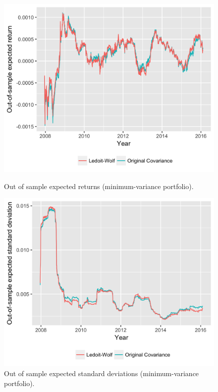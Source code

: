 \documentclass[letterpaper,12pt]{article}
\begin{document}
\begin{figure}[!tbp]
  \centering
  \begin{minipage}[t]{0.45\textwidth}
    \includegraphics[width=\textwidth]{fig_min_variance_ous_r.png}
    \caption{Out of sample expected returns (minimum-variance portfolio).\label{fig:fig_min_variance_ous_r}}
  \end{minipage}
  \hfill
  \begin{minipage}[t]{0.45\textwidth}
    \includegraphics[width=\textwidth]{fig_min_variance_ous_std.png}
    \caption{Out of sample expected standard deviations (minimum-variance portfolio).\label{fig:fig_min_variance_ous_std}}
  \end{minipage}
\end{figure}
\end{document}
